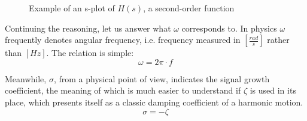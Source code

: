 \documentclass[a4paper, 10pt, final]{article} %
\begin{document}
    \begin{figure}[!htb]
        \centering
        \hspace{0.15\textwidth}
        \caption{Example of an s-plot of $H(s)$, a second-order function}
        \label{fig:ExampleSPlot}
    \end{figure}
    
    Continuing the reasoning, let us answer what \(\omega\) corresponds to.
    In physics \(\omega\) frequently denotes angular frequency, i.e. frequency measured in \([\frac{rad}{s}]\) rather than \([Hz]\). The relation is simple:
    \[ \omega = 2\pi\cdot f\]

    Meanwhile, \(\sigma\), from a physical point of view, indicates the signal growth coefficient, the meaning of which is much easier to understand if \(\zeta\) is used in its place, which presents itself as a classic damping coefficient of a harmonic motion.
    \[ \sigma = -\zeta\]
\end{document}
